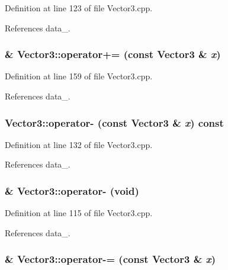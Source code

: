 Definition at line 123 of file Vector3.cpp.



References data\_\-.

\subsubsection[{operator+=}]{ \& Vector3::operator+= (const {\bf Vector3} \& {\em x})}\label{classVector3_a0c96d7fefbb7bb0b62d51094e53e6b62}


Definition at line 159 of file Vector3.cpp.



References data\_\-.

\subsubsection[{operator-\/}]{ Vector3::operator-\/ (const {\bf Vector3} \& {\em x}) const}\label{classVector3_a5ee2524456ce751c6da5d6e05adb53f9}


Definition at line 132 of file Vector3.cpp.



References data\_\-.

\subsubsection[{operator-\/}]{ \& Vector3::operator-\/ (void)}\label{classVector3_a59a714eaecbb762e374be1e97aaa7b78}


Definition at line 115 of file Vector3.cpp.



References data\_\-.

\subsubsection[{operator-\/=}]{ \& Vector3::operator-\/= (const {\bf Vector3} \& {\em x})}\label{classVector3_ad083727f119bc00233c6c1adba1d080b}


